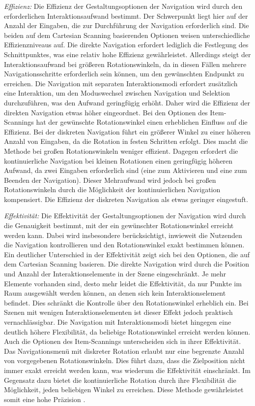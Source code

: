 \textit{Effizienz:}
Die Effizienz der Gestaltungsoptionen der Navigation wird durch den erforderlichen Interaktionsaufwand bestimmt. Der Schwerpunkt liegt hier auf der Anzahl der Eingaben, die zur Durchführung der Navigation erforderlich sind. Die beiden auf dem Cartesian Scanning basierenden Optionen weisen unterschiedliche Effizienzniveaus auf. Die direkte Navigation erfordert lediglich die Festlegung des Schnittpunktes, was eine relativ hohe Effizienz gewährleistet. Allerdings steigt der Interaktionsaufwand bei größeren Rotationswinkeln, da in diesen Fällen mehrere Navigationsschritte erforderlich sein können, um den gewünschten Endpunkt zu erreichen. Die Navigation mit separaten Interaktionsmodi erfordert zusätzlich eine Interaktion, um den Moduswechsel zwischen Navigation und Selektion durchzuführen, was den Aufwand geringfügig erhöht. Daher wird die Effizienz der direkten Navigation etwas höher eingeordnet. 
Bei den Optionen des Item-Scannings hat der gewünschte Rotationswinkel einen erheblichen Einfluss auf die Effizienz. Bei der diskreten Navigation führt ein größerer Winkel zu einer höheren Anzahl von Eingaben, da die Rotation in festen Schritten erfolgt. Dies macht die Methode bei großen Rotationswinkeln weniger effizient. Dagegen erfordert die kontinuierliche Navigation bei kleinen Rotationen einen geringfügig höheren Aufwand, da zwei Eingaben erforderlich sind (eine zum Aktivieren und eine zum Beenden der Navigation). Dieser Mehraufwand wird jedoch bei großen Rotationswinkeln durch die Möglichkeit der kontinuierlichen Navigation kompensiert. Die Effizienz der diskreten Navigation als etwas geringer eingestuft.

\textit{Effektivität:}
Die Effektivität der Gestaltungsoptionen der Navigation wird durch die Genauigkeit bestimmt, mit der ein gewünschter Rotationswinkel erreicht werden kann. Dabei wird insbesondere berücksichtigt, inwieweit die Nutzenden die Navigation kontrollieren und den Rotationswinkel exakt bestimmen können. 
Ein deutlicher Unterschied in der Effektivität zeigt sich bei den Optionen, die auf dem Cartesian Scanning basieren. Die direkte Navigation wird durch die Position und Anzahl der Interaktionselemente in der Szene eingeschränkt. Je mehr Elemente vorhanden sind, desto mehr leidet die Effektivität, da nur Punkte im Raum ausgewählt werden können, an denen sich kein Interaktionselement befindet. Dies schränkt die Kontrolle über den Rotationswinkel erheblich ein. Bei Szenen mit wenigen Interaktionselementen ist dieser Effekt jedoch praktisch vernachlässigbar. Die Navigation mit Interaktionsmodi bietet hingegen eine deutlich höhere Flexibilität, da beliebige Rotationswinkel erreicht werden können.
Auch die Optionen des Item-Scannings unterscheiden sich in ihrer Effektivität. Das Navigationsmenü mit diskreter Rotation erlaubt nur eine begrenzte Anzahl von vorgegebenen Rotationswinkeln. Dies führt dazu, dass die Zielposition nicht immer exakt erreicht werden kann, was wiederum die Effektivität einschränkt. Im Gegensatz dazu bietet die kontinuierliche Rotation durch ihre Flexibilität die Möglichkeit, jeden beliebigen Winkel zu erreichen. Diese Methode gewährleistet somit eine hohe Präzision \citep{10.1145/2159365.2159386}. 

